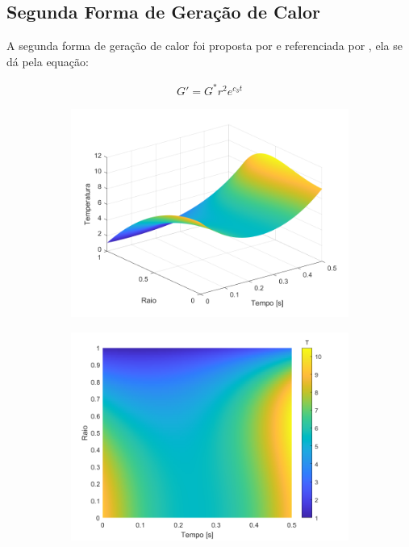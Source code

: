\subsection{Segunda Forma de Geração de Calor}

A segunda forma de geração de calor foi proposta por \citet{bhattacharya2001} e referenciada por \citet{soares2017}, ela se dá pela equação:

\begin{gather}
    G ' = G ^* r ^2 e ^{c_3 t}
    \label{eq:second_form_of_heat}
\end{gather}

\begin{figure}[H]
    \centering
    \caption{Perfis de temperatura para segunda forma de geração de calor: (a) perspectiva isométrica; (b) vista superior.}
    
    \begin{subfigure}{0.45\textwidth}
        \includegraphics[width=1\linewidth]{figures/results/Fig04.png} 
        \caption{}
    \end{subfigure}
    \begin{subfigure}{0.45\textwidth}
        \includegraphics[width=1\linewidth]{figures/results/Fig05.png}
        \caption{}
    \end{subfigure}
    
    \label{fig:surface02}
\end{figure}

